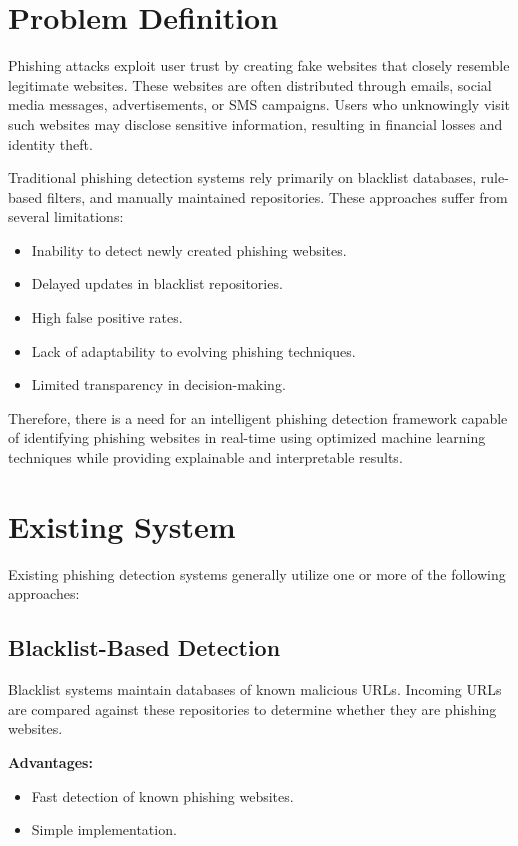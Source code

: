 \documentclass[12pt]{report}
\begin{document}
\section{Problem Definition}

Phishing attacks exploit user trust by creating fake websites that closely resemble legitimate websites. These websites are often distributed through emails, social media messages, advertisements, or SMS campaigns. Users who unknowingly visit such websites may disclose sensitive information, resulting in financial losses and identity theft.

Traditional phishing detection systems rely primarily on blacklist databases, rule-based filters, and manually maintained repositories. These approaches suffer from several limitations:

\begin{itemize}
    \item Inability to detect newly created phishing websites.
    \item Delayed updates in blacklist repositories.
    \item High false positive rates.
    \item Lack of adaptability to evolving phishing techniques.
    \item Limited transparency in decision-making.
\end{itemize}

Therefore, there is a need for an intelligent phishing detection framework capable of identifying phishing websites in real-time using optimized machine learning techniques while providing explainable and interpretable results.

\section{Existing System}

Existing phishing detection systems generally utilize one or more of the following approaches:

\subsection{Blacklist-Based Detection}

Blacklist systems maintain databases of known malicious URLs. Incoming URLs are compared against these repositories to determine whether they are phishing websites.

\textbf{Advantages:}
\begin{itemize}
    \item Fast detection of known phishing websites.
    \item Simple implementation.
\end{itemize}
\end{document}

